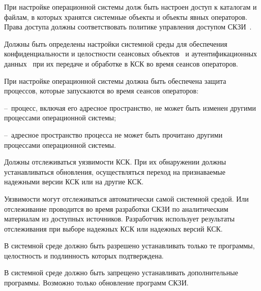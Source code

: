 \begin{note}
При настройке операционной системы долж быть настроен
доступ к каталогам и файлам, в которых хранятся системные объекты
и объекты явных операторов. Права доступа должны соответствовать 
политике управления доступом СКЗИ~.
\end{note}

\label{R.ES.Session} %
Должны быть определены настройки системной среды
для обеспечения конфиденциальности и целостности сеансовых 
объектов~ и аутентификационных 
данных~ при их передаче и  
обработке в КСК во время сеансов операторов.

\begin{note}
При настройке операционной системы должна быть обеспечена защита 
процессов, которые запускаются во время сеансов операторов:

--~процесс, включая его адресное пространство, не может быть 
изменен другими процессами операционной системы;

--~адресное пространство процесса не может быть прочитано другими процессами 
операционной системы.
\end{note}

\label{R.ES.CVE} %
Должны отслеживаться уязвимости КСК. При их обнаружении должны 
устанавливаться обновления, осуществляться переход на признаваемые надежными
версии КСК или на другие КСК.

\begin{note}
Уязвимости могут отслеживаться автоматически самой системной средой.
Или отслеживание проводится во время разработки СКЗИ по аналитическим
материалам из доступных источников. Разработчик использует результаты
отслеживания при выборе надежных КСК или надежных версий КСК.
\end{note}

\label{R.ES.AuthCode} %
В системной среде должно быть разрешено устанавливать только те программы,
целостность и подлинность которых подтверждена.


\label{R.ES.NoCode} %
В системной среде должно быть запрещено устанавливать дополнительные программы.
Возможно только обновление программ СКЗИ.

